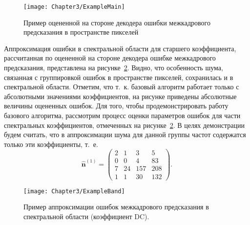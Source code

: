 \begin{figure}[htbp]
    \centering
    \texttt{[image: Chapter3/ExampleMain]}
    \caption{Пример оцененной на стороне декодера ошибки межкадрового предсказания в пространстве пикселей}
    \label{fig:chapCNM:ExampleMain}
\end{figure}

Аппроксимация ошибки в спектральной области для старшего коэффициента, рассчитанная по оцененной на стороне декодера ошибке межкадрового предсказания, представлена на рисунке~\ref{fig:chapCNM:ExampleBand}. Видно, что особенность шума, связанная с группировкой ошибок в пространстве пикселей, сохранилась и в спектральной области. Отметим, что т.~к. базовый алгоритм работает только с абсолютными значениями коэффициентов, на рисунке приведены абсолютные величины оцененных ошибок. Для того, чтобы продемонстрировать работу базового алгоритма, рассмотрим процесс оценки параметров ошибок для части спектральных коэффициентов, отмеченных на рисунке~\ref{fig:chapCNM:ExampleBand}. В целях демонстрации будем считать, что в аппроксимации шума для данной группы частот содержатся только эти коэффициенты, т.~е.
\begin{equation}
    \hat{\mathbf{n}}^{(1)} = 
    \left(
    \begin{matrix}
        2 &  1 &   3 &   5 \\
        0 &  0 &   4 &  83 \\
        7 & 24 & 157 & 208 \\
        1 &  1 &  30 & 132
    \end{matrix}
    \right).
    \label{eq:chapCNM:NoseDemo}
\end{equation}

\begin{figure}[htbp]
    \centering
    \texttt{[image: Chapter3/ExampleBand]}
    \caption{Пример аппроксимации ошибок межкадрового предсказания в спектральной области (коэффициент DC).}
    \label{fig:chapCNM:ExampleBand}
\end{figure}

